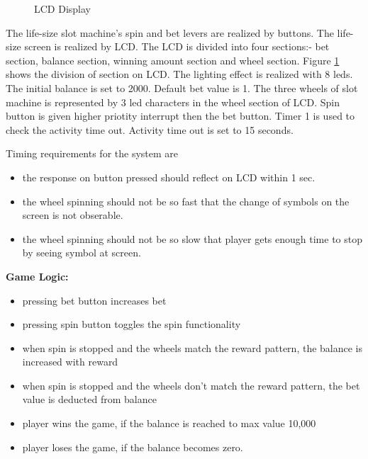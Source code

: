 \documentclass[a4paper,13pt,openany,sffamily]{memoir}
\begin{document}
\begin{figure}[h]
\caption{LCD Display }
\label{Fig_LCD_Split}
\end{figure}
The life-size slot machine's spin and bet levers are realized by buttons. The life-size screen is realized by LCD. The LCD is divided into four sections:- bet section, balance section, winning amount section and wheel section. Figure \ref{Fig_LCD_Split} shows the division of section on LCD. The lighting effect is realized with 8 leds. The initial balance is set to 2000. Default bet value is 1. The three wheels of slot machine is represented by 3 led characters in the wheel section of LCD. Spin button is given higher priotity interrupt then the bet button. Timer 1 is used to check the activity time out. Activity time out is set to 15 seconds.  


\break
Timing requirements for the system are
\begin{itemize}
\item the response on button pressed should reflect on LCD within 1 sec.
\item the wheel spinning should not be so fast that the change of symbols on the screen is not obserable.
\item the wheel spinning should not be so slow that player gets enough time to stop by seeing symbol at screen.
\end{itemize}


\large \textbf{ Game Logic:}

\begin{itemize}
\item pressing bet button increases bet
\item pressing spin button toggles the spin functionality 
\item when spin is stopped and the wheels match the reward pattern, the balance is increased with reward
\item when spin is stopped and the wheels don't match the reward pattern, the bet value is deducted from balance
\item player wins the game, if the balance is reached to max value 10,000
\item player loses the game, if the balance becomes zero.
\end{itemize}
\end{document}
